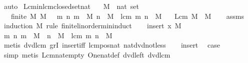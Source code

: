 \begin{isabellebody}
\ auto%
\endisatagproof
{\isafoldproof}%
%
\isadelimproof
\isanewline
%
\endisadelimproof
\isanewline
{}\isamarkupfalse%
\ Lcm{\isacharunderscore}{\kern0pt}in{\isacharunderscore}{\kern0pt}lcm{\isacharunderscore}{\kern0pt}closed{\isacharunderscore}{\kern0pt}set{\isacharunderscore}{\kern0pt}nat{\isacharcolon}{\kern0pt}\isanewline
\ \ \ M\ {\isacharcolon}{\kern0pt}{\isacharcolon}{\kern0pt}\ {\isachardoublequoteopen}nat\ set{\isachardoublequoteclose}\ \isanewline
\ \ \ {\isachardoublequoteopen}finite\ M{\isachardoublequoteclose}\ {\isachardoublequoteopen}M\ {\isasymnoteq}\ {\isacharbraceleft}{\kern0pt}{\isacharbraceright}{\kern0pt}{\isachardoublequoteclose}\ {\isachardoublequoteopen}{\isasymAnd}m\ n{\isachardot}{\kern0pt}\ {\isasymlbrakk}m\ {\isasymin}\ M{\isacharsemicolon}{\kern0pt}\ n\ {\isasymin}\ M{\isasymrbrakk}\ {\isasymLongrightarrow}\ lcm\ m\ n\ {\isasymin}\ M{\isachardoublequoteclose}\isanewline
\ \ \ {\isachardoublequoteopen}Lcm\ M\ {\isasymin}\ M{\isachardoublequoteclose}\isanewline
%
\isadelimproof
\ \ %
\endisadelimproof
%
\isatagproof
{}\isamarkupfalse%
\ assms\isanewline
{}\isamarkupfalse%
\ {\isacharparenleft}{\kern0pt}induction\ M\ rule{\isacharcolon}{\kern0pt}\ finite{\isacharunderscore}{\kern0pt}linorder{\isacharunderscore}{\kern0pt}min{\isacharunderscore}{\kern0pt}induct{\isacharparenright}{\kern0pt}\isanewline
\ \ \isamarkupfalse%
\ {\isacharparenleft}{\kern0pt}insert\ x\ M{\isacharparenright}{\kern0pt}\isanewline
\ \ \isamarkupfalse%
\ \isamarkupfalse%
\ {\isachardoublequoteopen}{\isasymAnd}m\ n{\isachardot}{\kern0pt}\ m\ {\isasymin}\ M\ {\isasymLongrightarrow}\ n\ {\isasymin}\ M\ {\isasymLongrightarrow}\ lcm\ m\ n\ {\isasymin}\ M{\isachardoublequoteclose}\isanewline
\ \ \ \ \isamarkupfalse%
\ {\isacharparenleft}{\kern0pt}metis\ dvd{\isacharunderscore}{\kern0pt}lcm{}\ gr{}I\ insert{\isacharunderscore}{\kern0pt}iff\ lcm{\isacharunderscore}{\kern0pt}pos{\isacharunderscore}{\kern0pt}nat\ nat{\isacharunderscore}{\kern0pt}dvd{\isacharunderscore}{\kern0pt}not{\isacharunderscore}{\kern0pt}less{\isacharparenright}{\kern0pt}\isanewline
\ \ \isamarkupfalse%
\ insert\ \isamarkupfalse%
\ {\isacharquery}{\kern0pt}case\isanewline
\ \ \ \ \isamarkupfalse%
\ simp\ {\isacharparenleft}{\kern0pt}metis\ Lcm{\isacharunderscore}{\kern0pt}nat{\isacharunderscore}{\kern0pt}empty\ One{\isacharunderscore}{\kern0pt}nat{\isacharunderscore}{\kern0pt}def\ dvd{\isacharunderscore}{\kern0pt}{}{\isacharunderscore}{\kern0pt}left\ dvd{\isacharunderscore}{\kern0pt}lcm{}{\isacharparenright}{\kern0pt}\isanewline

\end{isabellebody}
